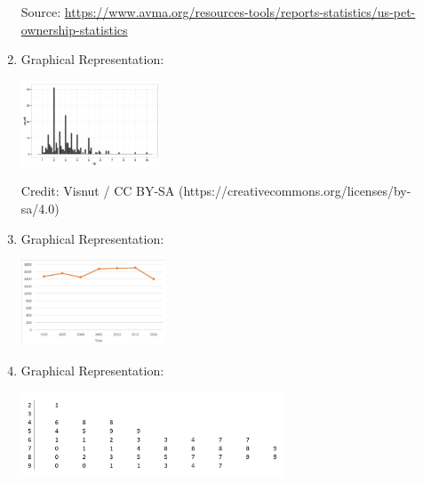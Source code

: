 \documentclass{ximera}
\begin{document}
\begin{problem}
\begin{enumerate}
 Source: \href{https://www.avma.org/resources-tools/reports-statistics/us-pet-ownership-statistics}{https://www.avma.org/resources-tools/reports-statistics/us-pet-ownership-statistics}
 \item Graphical Representation: 
    \begin{image}
   \includegraphics[height=1in]{140H2pic5.jpg}
 \end{image}
 Credit: Visnut / CC BY-SA (https://creativecommons.org/licenses/by-sa/4.0)
 \item Graphical Representation: 
    \begin{image}
   \includegraphics[height=1in]{140H2pic2.jpg}
 \end{image}
 \item Graphical Representation: 
    \begin{image}
   \includegraphics[height=1in]{140H2pic10.jpg}
 \end{image}
 
\end{enumerate}
\end{problem}
\end{document}
